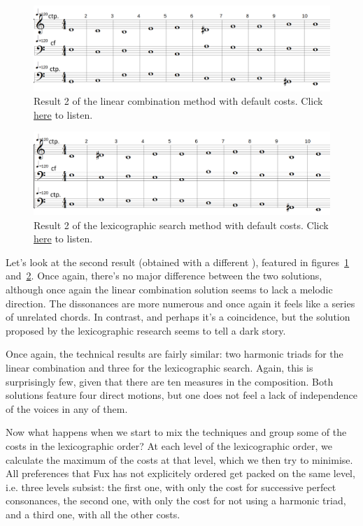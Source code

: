 \begin{figure}[h]
    \centering
    \includegraphics[width=1\textwidth]{Images/Experiments/linear-combination-1sp0.png}
    \caption{Result 2 of the linear combination method with default costs. Click \href{https://example.com/}{here} to listen.}
    \label{fig:combili-1sp0}
\end{figure}

\begin{figure}[h]
    \centering
    \includegraphics[width=1\textwidth]{Images/Experiments/basic-lexico-1sp0.png}
    \caption{Result 2 of the lexicographic search method with default costs. Click \href{https://youtu.be/FdsxyXVvBTE}{here} to listen.}
    \label{fig:lexico-1sp0}
\end{figure}

Let's look at the second result (obtained with a different \cf), featured in figures~\ref{fig:combili-1sp0} and~\ref{fig:lexico-1sp0}. Once again, there's no major difference between the two solutions, although once again the linear combination solution seems to lack a melodic direction. The dissonances are more numerous and once again it feels like a series of unrelated chords. In contrast, and perhaps it's a coincidence, but the solution proposed by the lexicographic research seems to tell a dark story.

Once again, the technical results are fairly similar: two harmonic triads for the linear combination and three for the lexicographic search. Again, this is surprisingly few, given that there are ten measures in the composition. Both solutions feature four direct motions, but one does not feel a lack of independence of the voices in any of them.

Now what happens when we start to mix the techniques and group some of the costs in the lexicographic order? At each level of the lexicographic order, we calculate the maximum of the costs at that level, which we then try to minimise. All preferences that Fux has not explicitely ordered get packed on the same level, i.e. three levels subsist: the first one, with only the cost for successive perfect consonances, the second one, with only the cost for not using a harmonic triad, and a third one, with all the other costs.

